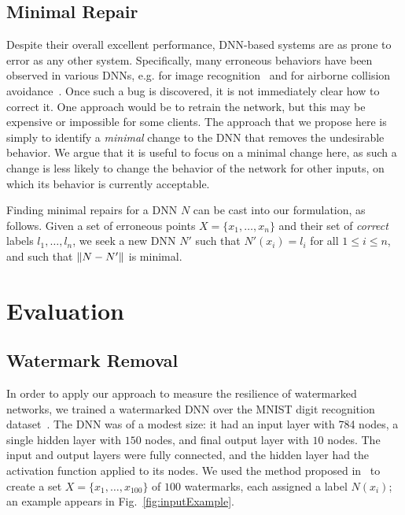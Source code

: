 \documentclass{easychair}
\newcommand{\relu}{\text{ReLU}\xspace{}}
\newcommand{\guy}[1]{\marginpar{\textcolor{orange}{Guy: #1}}}
\begin{document}
\subsection{Minimal Repair}
Despite their overall excellent performance, DNN-based systems are as
prone to error as any other system. Specifically, many erroneous
behaviors have been observed in various DNNs, e.g. for image
recognition~\cite{EyEvFeLiRaXiPrKo18,SzZaSuBrErGoFe13} and for airborne collision
avoidance~\cite{JuLoBrOwKo16,KaBaDiJuKo17Reluplex}. Once such a bug is
discovered, it is not immediately clear how to correct it. One
approach would be to retrain the network, but this may be expensive
or impossible for some clients. The approach that we propose here is
simply to identify a \emph{minimal} change to the DNN that removes the
undesirable behavior. We argue that it is useful to focus on a minimal
change here, as such a change is less likely to change the behavior of
the network for other inputs, on which its behavior is currently acceptable.

Finding minimal repairs for a DNN $N$ can be cast into our
formulation, as follows. Given a set of erroneous points
$X=\{x_1,\ldots,x_n\}$ and their set of \emph{correct} labels
$l_1,\ldots,l_n$, we seek a new DNN $N'$ such that $N'(x_i)=l_i$ for
all $1\leq i \leq n$, and such that 
 $\left\lVert N-N'\right\rVert$ is minimal. 

\section{Evaluation}
\label{sec:evaluation}

\subsection{Watermark Removal}

In order to apply our approach to measure the resilience of
watermarked networks, we trained a watermarked DNN over the MNIST
digit recognition dataset~\cite{mnist}. The DNN was of a modest size:
it had an input layer with 784 nodes, a single hidden layer with $150$
nodes, and final output layer with $10$ nodes. The input and output layers were fully
connected, and the hidden layer had the \relu{} activation function
applied to its nodes. We used the
method proposed in~\cite{AdBaPiKeWatermarking} to create a set
$X=\{x_1,\ldots, x_{100}\}$ of $100$ watermarks, each assigned a label
$N(x_i)$; an example appears in Fig.~\ref{fig:inputExample}.
\guy{TODO: fix broken ref, subfigure is messing it up}
\end{document}
